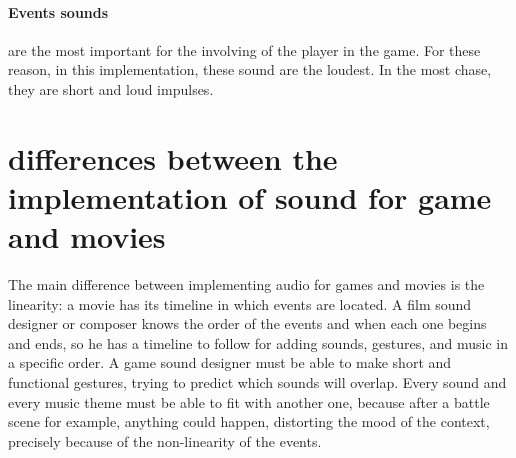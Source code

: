 \paragraph{Events sounds} are the most important for the involving of the player in the game. For these reason, in this implementation, these sound are the loudest. In the most chase, they are short and loud impulses.

\section{differences between the implementation of sound for game and movies}
The main difference between implementing audio for games and movies is the linearity: a movie has its timeline in which events are located. A film sound designer or composer knows the order of the events and when each one begins and ends, so he has a timeline to follow for adding sounds, gestures, and music in a specific order. A game sound designer must be able to make short and functional gestures, trying to predict which sounds will overlap. Every sound and every music theme must be able to fit with another one, because after a battle scene for example, anything could happen, distorting the mood of the context, precisely because of the non-linearity of the events.

